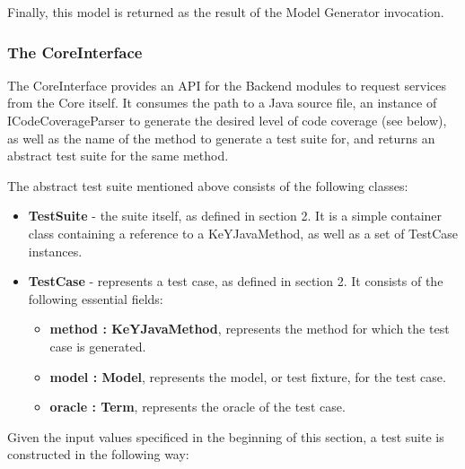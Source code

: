 \documentclass{article}
\newcommand{\tmstrong}[1]{\textbf{#1}}
\newenvironment{itemizedot}{\begin{itemize} \renewcommand{\labelitemi}{$\bullet$}\renewcommand{\labelitemii}{$\bullet$}\renewcommand{\labelitemiii}{$\bullet$}\renewcommand{\labelitemiv}{$\bullet$}}{\end{itemize}}
\newenvironment{itemizeminus}{\begin{itemize} \renewcommand{\labelitemi}{$-$}\renewcommand{\labelitemii}{$-$}\renewcommand{\labelitemiii}{$-$}\renewcommand{\labelitemiv}{$-$}}{\end{itemize}}
\begin{document}
Finally, this model is returned as the result of the Model Generator
invocation.



\subsubsection{The CoreInterface}

The CoreInterface provides an API for the Backend modules to request services
from the Core itself. It consumes the path to a Java source file, an instance
of ICodeCoverageParser to generate the desired level of code coverage (see
below), as well as the name of the method to generate a test suite for, and
returns an abstract test suite for the same method.



The abstract test suite mentioned above consists of the following classes:
\begin{itemizedot}
  \item {\tmstrong{TestSuite}} - the suite itself, as defined in section 2. It
  is a simple container class containing a reference to a KeYJavaMethod, as
  well as a set of TestCase instances.
  
  \item {\tmstrong{TestCase}} - represents a test case, as defined in section
  2. It consists of the following essential fields:
  \begin{itemizeminus}
    \item {\tmstrong{method : KeYJavaMethod}}, represents the method for which
    the test case is generated.
    
    \item {\tmstrong{model : Model}}, represents the model, or test fixture,
    for the test case.
    
    \item {\tmstrong{oracle : Term}}, represents the oracle of the test case.
    
    
  \end{itemizeminus}
\end{itemizedot}
Given the input values specificed in the beginning of this section, a test
suite is constructed in the following way:
\end{document}
